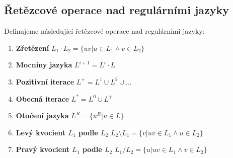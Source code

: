 \documentclass[a4paper,12pt,titlepage]{article}
\begin{document}
\subsection{Řetězcové operace nad regulárními jazyky}
\setcounter{equation}{0}
Definujeme následující řetězcové operace nad regulárními jazyky:
\begin{enumerate}
	\item \textbf{Zřetězení} $L_1 \cdot L_2 = \{ uv | u \in L_1 \land v \in L_2
	\}$
	\item \textbf{Mocniny jazyka} $L^{i+1} = L^i \cdot L$
	\item \textbf{Pozitivní iterace} $L^+ = L^1 \cup L^2 \cup ...$
	\item \textbf{Obecná iterace} $L^* = L^0 \cup L^+$
	\item \textbf{Otočení jazyka} $L^R = \{ u^R | u \in L \}$
	\item \textbf{Levý kvocient $L_1$ podle $L_2$} $ L_2 \setminus L_1 = \{ v |
	uv \in L_1 \land u \in L_2 \}$
	\item \textbf{Pravý kvocient $L_1$ podle $L_2$} $ L_1 / L_2 = \{ u | uv \in
	L_1 \land v \in L_2 \}$
\end{enumerate}
\end{document}
